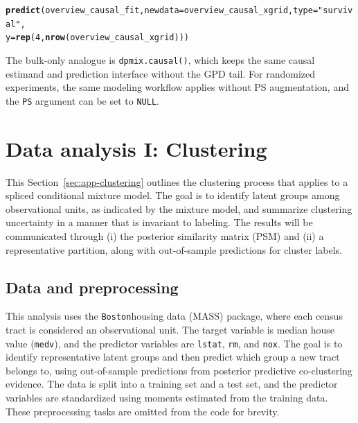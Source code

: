 \documentclass[article]{jss}\usepackage[]{graphicx}\usepackage[]{xcolor}
\makeatletter
\newcommand{\hlnum}[1]{\textcolor[rgb]{0.686,0.059,0.569}{#1}}%
\newcommand{\hlsng}[1]{\textcolor[rgb]{0.192,0.494,0.8}{#1}}%
\newcommand{\hldef}[1]{\textcolor[rgb]{0.345,0.345,0.345}{#1}}%
\newcommand{\hlkwc}[1]{\textcolor[rgb]{0.333,0.667,0.333}{#1}}%
\newcommand{\hlkwd}[1]{\textcolor[rgb]{0.737,0.353,0.396}{\textbf{#1}}}%
\newenvironment{kframe}{%
 \def\at@end@of@kframe{}%
 \ifinner\ifhmode%
  \def\at@end@of@kframe{\end{minipage}}%
  \begin{minipage}{\columnwidth}%
 \fi\fi%
 \def\FrameCommand##1{\hskip\@totalleftmargin \hskip-\fboxsep
 \colorbox{shadecolor}{##1}\hskip-\fboxsep
     \hskip-\linewidth \hskip-\@totalleftmargin \hskip\columnwidth}%
 \MakeFramed {\advance\hsize-\width
   \@totalleftmargin\z@ \linewidth\hsize
   \@setminipage}}%
 {\par\unskip\endMakeFramed%
 \at@end@of@kframe}
\newenvironment{knitrout}{}{} %
\DeclareRobustCommand{\pkg}[1]{\textsf{#1}}
\DeclareRobustCommand{\code}[1]{\nolinkurl{#1}}
\makeatother
\begin{document}
\begin{knitrout}\footnotesize
{}\color{fgcolor}\begin{kframe}
\begin{alltt}
\hlkwd{predict}\hldef{(overview_causal_fit,}\hlkwc{newdata} \hldef{= overview_causal_xgrid,}\hlkwc{type} \hldef{=} \hlsng{"survival"}\hldef{,}
        \hlkwc{y} \hldef{=} \hlkwd{rep}\hldef{(}\hlnum{4}\hldef{,} \hlkwd{nrow}\hldef{(overview_causal_xgrid)))}
\end{alltt}
\end{kframe}
\end{knitrout}

The bulk-only analogue is \code{dpmix.causal()}, which keeps the same causal
estimand and prediction interface without the GPD tail. For randomized experiments, the same modeling workflow applies without PS augmentation, and the \code{PS} argument can be set to \code{NULL}.


\section{Data analysis I: Clustering}
\label{sec:app-clustering}



This Section~\eqref{sec:app-clustering} outlines the clustering process that applies to a spliced conditional mixture model. The goal is to identify latent groups among observational units, as indicated by the mixture model, and summarize clustering uncertainty in a manner that is invariant to labeling. The results will be communicated through (i) the posterior similarity matrix (PSM) and (ii) a representative partition, along with out-of-sample predictions for cluster labels.


\subsection{Data and preprocessing}

This analysis uses the \code{Boston}housing data (\pkg{MASS}) package, where each census tract is considered an observational unit. The target variable is median house value (\code{medv}), and the predictor variables are \code{lstat}, \code{rm}, and \code{nox}. The goal is to identify representative latent groups and then predict which group a new tract belongs to, using out-of-sample predictions from posterior predictive co-clustering evidence. The data is split into a training set and a test set, and the predictor variables are standardized using moments estimated from the training data. These preprocessing tasks are omitted from the code for brevity.
\end{document}
